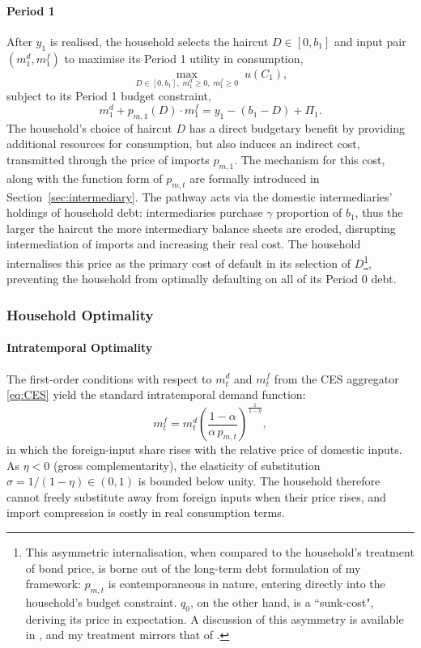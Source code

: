 \documentclass[11pt]{article}
\theoremstyle{definition}
\theoremstyle{plain}
\theoremstyle{remark}
\newcommand{\mf}{m^{f}}
\newcommand{\md}{m^{d}}
\begin{document}
\paragraph{Period 1} After $y_1$ is realised, the household selects the haircut $D \in [0, b_1]$ and input pair $(\md_1, \mf_1)$ to maximise its Period 1 utility in consumption,
\begin{equation}\label{eq:hh_p1}
\max_{D \in [0,b_1],\; \md_1 \geq 0,\; \mf_1 \geq 0} \; u(C_1),
\end{equation}
subject to its Period 1 budget constraint,
\begin{equation}\label{eq:bc1}
\md_1 + p_{m,1}(D) \cdot \mf_1 = y_1 - (b_1 - D) + \Pi_1.
\end{equation} %
The household's choice of haircut $D$ has a direct budgetary benefit by providing additional resources for consumption, but also induces an indirect cost, transmitted through the price of imports $p_{m,1}$. The mechanism for this cost, along with the function form of $p_{m,t}$ are formally introduced in Section~\ref{sec:intermediary}. The pathway acts via the domestic intermediaries' holdings of household debt: intermediaries purchase $\gamma$ proportion of $b_1$, thus the larger the haircut the more intermediary balance sheets are eroded, disrupting intermediation of imports and increasing their real cost. The household internalises this price as the primary cost of default in its selection of $D$\footnote{This asymmetric internalisation, when compared to the household's treatment of bond price, is borne out of the long-term debt formulation of my framework: $p_{m,t}$ is contemporaneous in nature, entering directly into the household's budget constraint. $q_0$, on the other hand, is a ``sunk-cost", deriving its price in expectation. A discussion of this asymmetry is available in \citet{aguiar_take_2019}, and my treatment mirrors that of \citet{mendoza_general_2012, goodhart_debt_2018}.}, preventing the household from optimally defaulting on all of its Period 0 debt.

\subsubsection*{Household Optimality}

\paragraph{Intratemporal Optimality} The first-order conditions with respect to $\md_t$ and $\mf_t$ from the CES aggregator \eqref{eq:CES} yield the standard intratemporal demand function:
\begin{equation}\label{eq:mf_demand}
\mf_t = \md_t \left(\frac{1-\alpha}{\alpha\, p_{m,t}}\right)^{\!\frac{1}{1-\eta}},
\end{equation}
in which the foreign-input share rises with the relative price of domestic inputs. As $\eta < 0$ (gross complementarity), the elasticity of substitution $\sigma = 1/(1-\eta) \in (0,1)$ is bounded below unity. The household therefore cannot freely substitute away from foreign inputs when their price rises, and import compression is costly in real consumption terms. 
\end{document}
